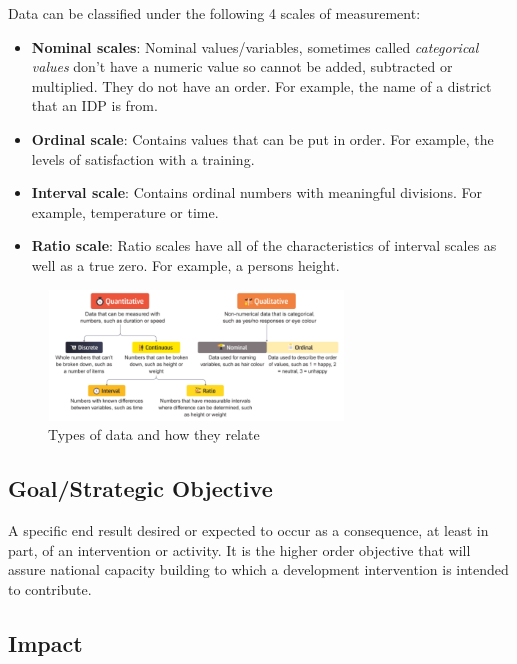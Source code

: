 \documentclass[
  a4paper,
  onecolumn,
  oneside]{book}
\begin{document}
Data can be classified under the following 4 scales of measurement:

\begin{itemize}
\item
  \textbf{Nominal scales}: Nominal values/variables, sometimes called
  \emph{categorical values} don't have a numeric value so cannot be
  added, subtracted or multiplied. They do not have an order. For
  example, the name of a district that an IDP is from.
\item
  \textbf{Ordinal scale}: Contains values that can be put in order. For
  example, the levels of satisfaction with a training.
\item
  \textbf{Interval scale}: Contains ordinal numbers with meaningful
  divisions. For example, temperature or time.
\item
  \textbf{Ratio scale}: Ratio scales have all of the characteristics of
  interval scales as well as a true zero. For example, a persons height.
\end{itemize}

\begin{figure}

{\centering \includegraphics[width=0.7\textwidth,height=\textheight]{part1/./images/typesofdata.png}

}

\caption{Types of data and how they relate}

\end{figure}

\hypertarget{goalstrategic-objective}{%
\subsection{Goal/Strategic Objective}\label{goalstrategic-objective}}

A specific end result desired or expected to occur as a consequence, at
least in part, of an intervention or activity. It is the higher order
objective that will assure national capacity building to which a
development intervention is intended to contribute.

\hypertarget{impact}{%
\subsection{Impact}\label{impact}}
\end{document}
